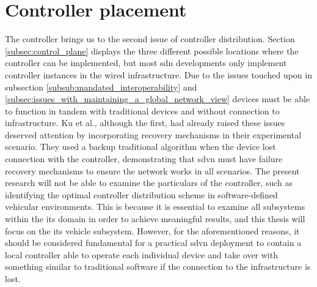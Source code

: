 \section{Controller placement}
The controller brings us to the second issue of controller distribution. Section \ref{subsec:control_plane} displays the three different possible locations where the controller can be implemented, but most \gls{sdn} developments only implement controller instances in the wired infrastructure. Due to the issues touched upon in subsection \ref{subsub:mandated_interoperability} and \ref{subsec:issues_with_maintaining_a_global_network_view} devices must be able to function in tandem with traditional devices and without connection to infrastructure. 
Ku et al.\cite{ku_towards_2014}, although the first, had already raised these issues deserved attention by incorporating recovery mechanisms in their experimental scenario. They used a backup traditional algorithm when the device lost connection with the controller, demonstrating that \gls{sdvn} must have failure recovery mechanisms to ensure the network works in all scenarios.
The present research will not be able to examine the particulars of the controller, such as identifying the optimal controller distribution scheme in software-defined vehicular environments. This is because it is essential to examine all subsystems within the \gls{its} domain in order to achieve meaningful results, and this thesis will focus on the \gls{its} vehicle subsystem.
However, for the aforementioned reasons, it should be considered fundamental for a practical \gls{sdvn} deployment to contain a local controller able to operate each individual device and take over with something similar to traditional software if the connection to the infrastructure is lost. 
    